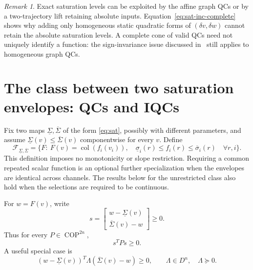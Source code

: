 \documentclass[10pt,a4paper]{article}
\theoremstyle{definition}
\theoremstyle{remark}
\newtheorem{remark}{Remark}
\newcommand{\COP}{\operatorname{COP}}
\newcommand{\col}{\operatorname{col}}
\newcommand{\Fenv}{\mathcal F_{\underline\Sigma,\overline\Sigma}}
\begin{document}
\begin{remark}
Exact saturation levels can be exploited by the affine graph QCs or by a two-trajectory lift retaining absolute inputs. Equation~\eqref{eq:sat-inc-complete} shows why adding only homogeneous static quadratic forms of $(\delta v,\delta w)$ cannot retain the absolute saturation levels. A complete cone of valid QCs need not uniquely identify a function: the sign-invariance issue discussed in~\cite{relu} still applies to homogeneous graph QCs.
\end{remark}

\section{The class between two saturation envelopes: QCs and IQCs}
Fix two maps $\underline\Sigma,\overline\Sigma$ of the form \eqref{eq:sat}, possibly with different parameters, and assume $\underline\Sigma(v)\le\overline\Sigma(v)$ componentwise for every $v$. Define
\begin{equation}\label{eq:env-class}
 \Fenv=\{F:\ F(v)=\col(f_i(v_i)),\quad
 \underline\sigma_i(r)\le f_i(r)\le\overline\sigma_i(r)\quad\forall r,i\}.
\end{equation}
This definition imposes no monotonicity or slope restriction. Requiring a common repeated scalar function is an optional further specialization when the envelopes are identical across channels. The results below for the unrestricted class also hold when the selections are required to be continuous.

For $w=F(v)$, write
\begin{equation}\label{eq:env-slack}
 s=\begin{bmatrix}w-\underline\Sigma(v)\\\overline\Sigma(v)-w\end{bmatrix}\ge0.
\end{equation}
Thus for every $P\in\COP^{2n}$,
\begin{equation}\label{eq:env-cop}
 s^TPs\ge0.
\end{equation}
A useful special case is
\begin{equation}\label{eq:env-sector}
 (w-\underline\Sigma(v))^T\Lambda(\overline\Sigma(v)-w)\ge0,
 \qquad\Lambda\in D^n,\quad\Lambda\succeq0.
\end{equation}
\end{document}
